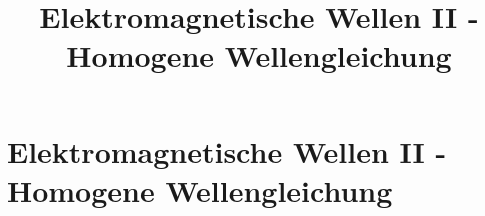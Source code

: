 
  
\title[TET: Elektromagnetische Wellen II - Homogene Wellengleichung]{Elektromagnetische Wellen II - Homogene Wellengleichung}


% 
% 

\maketitle

% 
% 
\section{Elektromagnetische Wellen II - Homogene Wellengleichung}

